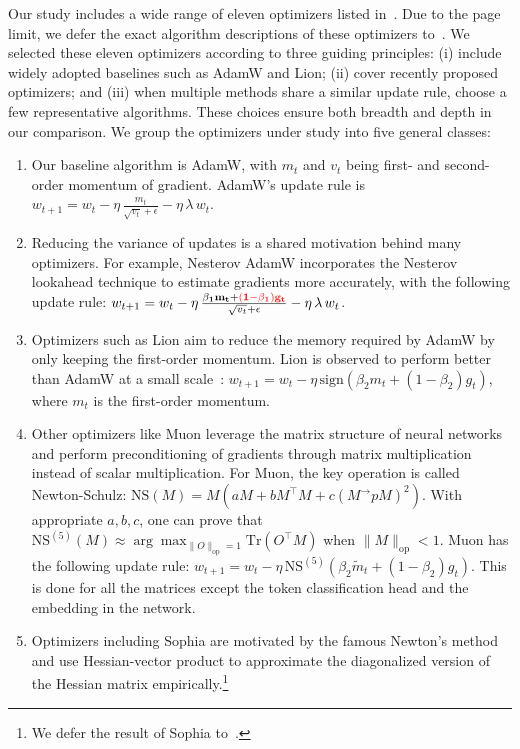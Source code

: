 Our study includes a wide range of eleven optimizers listed in~. Due to the page limit, we defer the exact algorithm descriptions of these optimizers to~. We selected these eleven optimizers according to three guiding principles: (i) include widely adopted baselines such as AdamW and Lion; (ii) cover recently proposed optimizers; and (iii) when multiple methods share a similar update rule, choose a few representative algorithms. These choices ensure both breadth and depth in our comparison. We group the optimizers under study into five general classes:
\begin{enumerate}[leftmargin=*]
\item Our baseline algorithm is AdamW, with $m_t$ and $v_t$ being first- and second-order momentum of gradient. AdamW's update rule is $w_{t+1} = w_t 
    - \eta\,\frac{{m_t}}{\sqrt{v_t} + \epsilon}
    - \eta\,\lambda\,w_t$.
\item Reducing the variance of updates is a shared motivation behind many optimizers. For example, Nesterov AdamW incorporates the Nesterov lookahead technique to estimate gradients more accurately, with the following update rule:
$w_{t+1} = w_t 
    - \eta\,\frac{\mathbf{\beta_1 m_t + \color{red}( 1 - \beta_1)g_t}}{\sqrt{v_t} + \epsilon}
    - \eta \,\lambda\,w_t$.
\item Optimizers such as Lion aim to reduce the memory required by AdamW by only keeping the first-order momentum. Lion is observed to perform better than AdamW at a small scale~\cite{liang2025cautious}: $w_{t+1} = w_t 
    - \eta\, \mathrm{sign}(\beta_2 m_t + (1 - \beta_2)g_t)$, where $m_t$ is the first-order momentum.
\item Other optimizers like Muon leverage the matrix structure of neural networks and perform preconditioning of gradients through matrix multiplication instead of scalar multiplication. For Muon, the key operation is called Newton-Schulz: $\mathrm{NS}(M) = M (aM + bM^\top M + c(M^\to pM)^2)$. With appropriate $a,b,c$, one can prove that $\mathrm{NS}^{(5)}(M) \approx \arg \max_{\|O\|_{\mathrm{op}} = 1} \mathrm{Tr}( O^\top M)$ when $\|M\|_{\mathrm{op}} < 1$. Muon has the following update rule: $w_{t+1} = w_t 
    - \eta\, \mathrm{NS^{(5)}}(\beta_2 \tilde m_t + (1 - \beta_2)g_t)$. This is done for all the matrices except the token classification head and the embedding in the network. 
\item Optimizers including Sophia are motivated by the famous Newton's method and use Hessian-vector product to approximate the diagonalized version of the Hessian matrix empirically.\footnote{We defer the result of Sophia to~.}
 \end{enumerate}


